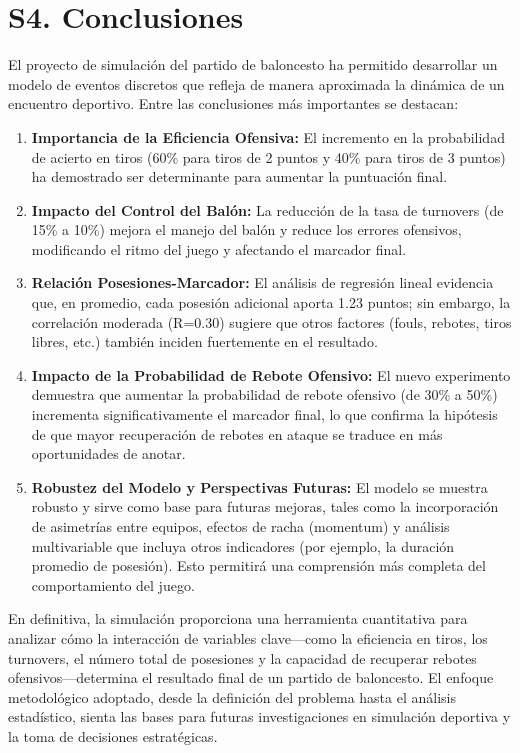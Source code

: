 \documentclass[12pt]{article}
\begin{document}
\section{S4. Conclusiones}
El proyecto de simulación del partido de baloncesto ha permitido desarrollar un modelo de eventos discretos que refleja de manera aproximada la dinámica de un encuentro deportivo. Entre las conclusiones más importantes se destacan:
\begin{enumerate}
	\item \textbf{Importancia de la Eficiencia Ofensiva:} El incremento en la probabilidad de acierto en tiros (60\% para tiros de 2 puntos y 40\% para tiros de 3 puntos) ha demostrado ser determinante para aumentar la puntuación final.
	\item \textbf{Impacto del Control del Balón:} La reducción de la tasa de turnovers (de 15\% a 10\%) mejora el manejo del balón y reduce los errores ofensivos, modificando el ritmo del juego y afectando el marcador final.
	\item \textbf{Relación Posesiones-Marcador:} El análisis de regresión lineal evidencia que, en promedio, cada posesión adicional aporta 1.23 puntos; sin embargo, la correlación moderada (R=0.30) sugiere que otros factores (fouls, rebotes, tiros libres, etc.) también inciden fuertemente en el resultado.
	\item \textbf{Impacto de la Probabilidad de Rebote Ofensivo:} El nuevo experimento demuestra que aumentar la probabilidad de rebote ofensivo (de 30\% a 50\%) incrementa significativamente el marcador final, lo que confirma la hipótesis de que mayor recuperación de rebotes en ataque se traduce en más oportunidades de anotar.
	\item \textbf{Robustez del Modelo y Perspectivas Futuras:} El modelo se muestra robusto y sirve como base para futuras mejoras, tales como la incorporación de asimetrías entre equipos, efectos de racha (momentum) y análisis multivariable que incluya otros indicadores (por ejemplo, la duración promedio de posesión). Esto permitirá una comprensión más completa del comportamiento del juego.
\end{enumerate}
En definitiva, la simulación proporciona una herramienta cuantitativa para analizar cómo la interacción de variables clave---como la eficiencia en tiros, los turnovers, el número total de posesiones y la capacidad de recuperar rebotes ofensivos---determina el resultado final de un partido de baloncesto. El enfoque metodológico adoptado, desde la definición del problema hasta el análisis estadístico, sienta las bases para futuras investigaciones en simulación deportiva y la toma de decisiones estratégicas.
\end{document}
